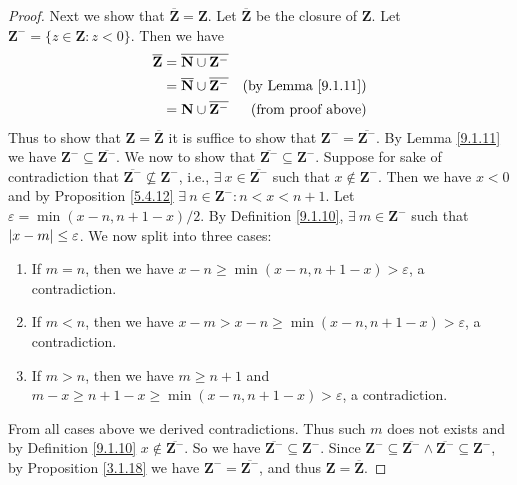 \begin{proof}
    Next we show that \(\overline{\mathbf{Z}} = \mathbf{Z}\).
    Let \(\overline{\mathbf{Z}}\) be the closure of \(\mathbf{Z}\).
    Let \(\mathbf{Z}^- = \{z \in \mathbf{Z} : z < 0\}\).
    Then we have
    \begin{align*}
        \overline{\mathbf{Z}} & = \overline{\mathbf{N} \cup \mathbf{Z}^-}                                             \\
                              & = \overline{\mathbf{N}} \cup \overline{\mathbf{Z}^-} & \text{(by Lemma \ref{9.1.11})} \\
                              & = \mathbf{N} \cup \overline{\mathbf{Z}^-}            & \text{(from proof above)}
    \end{align*}
    Thus to show that \(\mathbf{Z} = \overline{\mathbf{Z}}\) it is suffice to show that \(\mathbf{Z}^- = \overline{\mathbf{Z}^-}\).
    By Lemma \ref{9.1.11} we have \(\mathbf{Z}^- \subseteq \overline{\mathbf{Z}^-}\).
    We now to show that \(\overline{\mathbf{Z}^-} \subseteq \mathbf{Z}^-\).
    Suppose for sake of contradiction that \(\overline{\mathbf{Z}^-} \not\subseteq \mathbf{Z}^-\), i.e., \(\exists\ x \in \overline{\mathbf{Z}^-}\) such that \(x \notin \mathbf{Z}^-\).
    Then we have \(x < 0\) and by Proposition \ref{5.4.12} \(\exists\ n \in \mathbf{Z}^- : n < x < n + 1\).
    Let \(\varepsilon = \min(x - n, n + 1 - x) / 2\).
    By Definition \ref{9.1.10}, \(\exists\ m \in \mathbf{Z}^-\) such that \(\abs*{x - m} \leq \varepsilon\).
    We now split into three cases:
    \begin{enumerate}
        \item If \(m = n\), then we have \(x - n \geq \min(x - n, n + 1 - x) > \varepsilon\), a contradiction.
        \item If \(m < n\), then we have \(x - m > x - n \geq \min(x - n, n + 1 - x) > \varepsilon\), a contradiction.
        \item If \(m > n\), then we have \(m \geq n + 1\) and \(m - x \geq n + 1 - x \geq \min(x - n, n + 1 - x) > \varepsilon\), a contradiction.
    \end{enumerate}
    From all cases above we derived contradictions.
    Thus such \(m\) does not exists and by Definition \ref{9.1.10} \(x \notin \overline{\mathbf{Z}^-}\).
    So we have \(\overline{\mathbf{Z}^-} \subseteq \mathbf{Z}^-\).
    Since \(\mathbf{Z}^- \subseteq \overline{\mathbf{Z}^-} \land \overline{\mathbf{Z}^-} \subseteq \mathbf{Z}^-\), by Proposition \ref{3.1.18} we have \(\mathbf{Z}^- = \overline{\mathbf{Z}^-}\), and thus \(\mathbf{Z} = \overline{\mathbf{Z}}\).


\end{proof}
